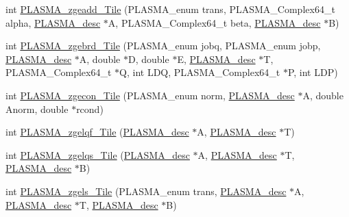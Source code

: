 \begin{DoxyCompactItemize}
\item 
int \hyperlink{group__PLASMA__Complex64__t__Tile_gaafc746e5c19b39b5f458cb439ef3c4de_gaafc746e5c19b39b5f458cb439ef3c4de}{P\+L\+A\+S\+M\+A\+\_\+zgeadd\+\_\+\+Tile} (P\+L\+A\+S\+M\+A\+\_\+enum trans, P\+L\+A\+S\+M\+A\+\_\+\+Complex64\+\_\+t alpha, \hyperlink{structplasma__desc__t}{P\+L\+A\+S\+M\+A\+\_\+desc} $\ast$A, P\+L\+A\+S\+M\+A\+\_\+\+Complex64\+\_\+t beta, \hyperlink{structplasma__desc__t}{P\+L\+A\+S\+M\+A\+\_\+desc} $\ast$B)
\item 
int \hyperlink{group__PLASMA__Complex64__t__Tile_ga67906c65812f08b96ba2545adbf95791_ga67906c65812f08b96ba2545adbf95791}{P\+L\+A\+S\+M\+A\+\_\+zgebrd\+\_\+\+Tile} (P\+L\+A\+S\+M\+A\+\_\+enum jobq, P\+L\+A\+S\+M\+A\+\_\+enum jobp, \hyperlink{structplasma__desc__t}{P\+L\+A\+S\+M\+A\+\_\+desc} $\ast$A, double $\ast$D, double $\ast$E, \hyperlink{structplasma__desc__t}{P\+L\+A\+S\+M\+A\+\_\+desc} $\ast$T, P\+L\+A\+S\+M\+A\+\_\+\+Complex64\+\_\+t $\ast$Q, int L\+D\+Q, P\+L\+A\+S\+M\+A\+\_\+\+Complex64\+\_\+t $\ast$P, int L\+D\+P)
\item 
int \hyperlink{group__PLASMA__Complex64__t__Tile_ga237a71fdab53ef136376326cc02d0384_ga237a71fdab53ef136376326cc02d0384}{P\+L\+A\+S\+M\+A\+\_\+zgecon\+\_\+\+Tile} (P\+L\+A\+S\+M\+A\+\_\+enum norm, \hyperlink{structplasma__desc__t}{P\+L\+A\+S\+M\+A\+\_\+desc} $\ast$A, double Anorm, double $\ast$rcond)
\item 
int \hyperlink{group__PLASMA__Complex64__t__Tile_ga67a829a6a8c8fa6f0fbdfee5ea61ce12_ga67a829a6a8c8fa6f0fbdfee5ea61ce12}{P\+L\+A\+S\+M\+A\+\_\+zgelqf\+\_\+\+Tile} (\hyperlink{structplasma__desc__t}{P\+L\+A\+S\+M\+A\+\_\+desc} $\ast$A, \hyperlink{structplasma__desc__t}{P\+L\+A\+S\+M\+A\+\_\+desc} $\ast$T)
\item 
int \hyperlink{group__PLASMA__Complex64__t__Tile_gaa6c2e67e567c4f9a4e3f3a84e4b54b8c_gaa6c2e67e567c4f9a4e3f3a84e4b54b8c}{P\+L\+A\+S\+M\+A\+\_\+zgelqs\+\_\+\+Tile} (\hyperlink{structplasma__desc__t}{P\+L\+A\+S\+M\+A\+\_\+desc} $\ast$A, \hyperlink{structplasma__desc__t}{P\+L\+A\+S\+M\+A\+\_\+desc} $\ast$T, \hyperlink{structplasma__desc__t}{P\+L\+A\+S\+M\+A\+\_\+desc} $\ast$B)
\item 
int \hyperlink{group__PLASMA__Complex64__t__Tile_ga2bb601838348c183a781a1ec00023065_ga2bb601838348c183a781a1ec00023065}{P\+L\+A\+S\+M\+A\+\_\+zgels\+\_\+\+Tile} (P\+L\+A\+S\+M\+A\+\_\+enum trans, \hyperlink{structplasma__desc__t}{P\+L\+A\+S\+M\+A\+\_\+desc} $\ast$A, \hyperlink{structplasma__desc__t}{P\+L\+A\+S\+M\+A\+\_\+desc} $\ast$T, \hyperlink{structplasma__desc__t}{P\+L\+A\+S\+M\+A\+\_\+desc} $\ast$B)

\end{DoxyCompactItemize}
